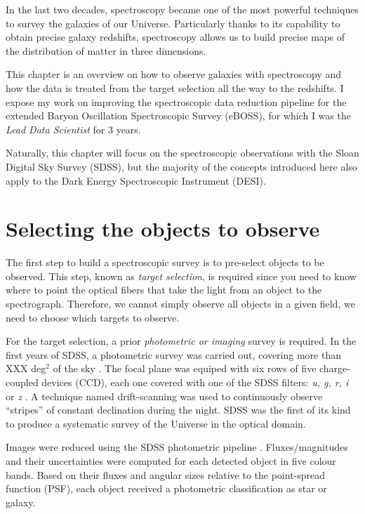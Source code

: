 \chaptertoc{}


\vspace{1em}

In the last two decades, spectroscopy became one of the most powerful
techniques to survey the galaxies of our Universe. 
Particularly thanks to its capability to obtain precise galaxy redshifts, 
spectroscopy allows us to build precise maps of the distribution 
of matter in three dimensions. 

This chapter is an overview on how to observe galaxies with 
spectroscopy and how the data is treated from the target selection 
all the way to the redshifts. 
I expose my work on improving the spectroscopic
data reduction pipeline for the extended Baryon Oscillation 
Spectroscopic Survey (eBOSS), for which I was the \emph{Lead Data Scientist}
for 3 years. 

Naturally, this chapter will 
focus on the spectroscopic observations with the 
Sloan Digital Sky Survey (SDSS), but the majority of the 
concepts introduced here also apply to the Dark Energy 
Spectroscopic Instrument (DESI). 


\section{Selecting the objects to observe}
\label{spectro:target}

The first step to build a spectroscopic survey is to pre-select 
objects to be observed. This step, known as \emph{target
selection}, is required since you need to know where to point 
the optical fibers that take the light from an object to the spectrograph.
Therefore, we cannot simply
observe all objects in a given field, we need to choose which targets to observe.

For the target selection, a prior \emph{photometric or imaging} 
survey is required. In the first years of SDSS, a photometric
survey was carried out, covering more than 
XXX deg$^2$ of the sky \cite{yorkSloanDigitalSky2000}. 
The focal plane was equiped with six rows of five 
charge-coupled devices (CCD), each one covered with one of 
the SDSS filters: \textit{u, g, r, i} or \textit{z} 
\cite{gunnSloanDigitalSky1998, doiPhotometricResponseFunctions2010}.
A technique named drift-scanning was used to continuously observe 
``stripes'' of constant declination during the night.
SDSS was the first of its kind to produce a systematic survey 
of the Universe in the optical domain.

Images were reduced using the SDSS photometric pipeline 
\cite{luptonSDSSImagingPipelines2001, padmanabhanImprovedPhotometricCalibration2008}. 
Fluxes/magnitudes and their uncertainties 
were computed for each detected object in five colour bands. 
Based on their fluxes and angular sizes relative to the 
point-spread function (PSF), each object received a 
photometric classification as star or galaxy.

